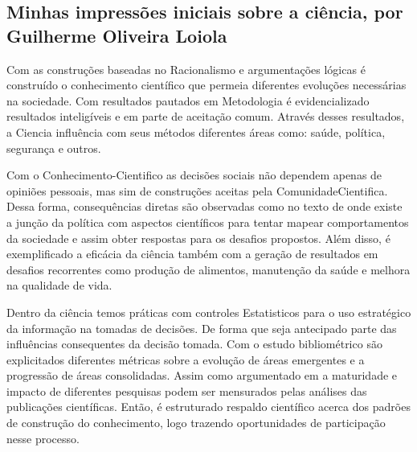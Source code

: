 \subsection{Minhas impressões iniciais sobre a ciência, por Guilherme Oliveira Loiola}

Com as construções baseadas no \gls{Racionalismo} e argumentações lógicas é construído o conhecimento científico que permeia diferentes evoluções necessárias na sociedade. Com resultados pautados em \gls{Metodologia} é evidencializado resultados inteligíveis e em parte de aceitação comum. Através desses resultados, a \gls{Ciencia} influência com seus métodos diferentes áreas como: saúde, política, segurança e outros. 

Com o \gls{Conhecimento-Cientifico} as decisões sociais não dependem apenas de opiniões pessoais, mas sim de construções aceitas pela \gls{ComunidadeCientifica}. Dessa forma, consequências diretas são observadas como no texto de \citet{frickel_new_2006} onde existe a junção da política com aspectos científicos para tentar mapear comportamentos da sociedade e assim obter respostas para os desafios propostos. Além disso, é exemplificado a eficácia da ciência também com a geração de resultados em desafios recorrentes como produção de alimentos, manutenção da saúde e melhora na qualidade de vida.  

Dentro da ciência temos práticas com controles \gls{Estatisticos} para o uso estratégico da informação na tomadas de decisões. De forma que seja antecipado parte das influências consequentes da decisão tomada. Com o estudo bibliométrico são explicitados diferentes métricas sobre a evolução de áreas emergentes e a progressão de áreas consolidadas. Assim como argumentado em \citet{santa_soriano_bibliometric_2018} a maturidade e impacto de diferentes pesquisas podem ser mensurados pelas análises das publicações científicas. Então, é estruturado respaldo científico acerca dos padrões de construção do conhecimento, logo trazendo oportunidades de participação nesse processo.
